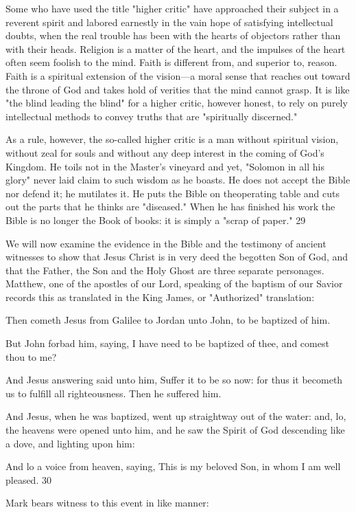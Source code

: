 Some who have used the title "higher critic" have approached their subject in a reverent spirit
and labored earnestly in the vain hope of satisfying intellectual doubts, when the real trouble
has been with the hearts of objectors rather than with their heads. Religion is a matter of the
heart, and the impulses of the heart often seem foolish to the mind. Faith is different from,
and superior to, reason. Faith is a spiritual extension of the vision—a moral sense that
reaches out toward the throne of God and takes hold of verities that the mind cannot grasp. It
is like "the blind leading the blind" for a higher critic, however honest, to rely on purely
intellectual methods to convey truths that are "spiritually discerned."

As a rule, however, the so-called higher critic is a man without spiritual vision, without zeal
for souls and without any deep interest in the coming of God's Kingdom. He toils not in the
Master's vineyard and yet, "Solomon in all his glory" never laid claim to such wisdom as he
boasts. He does not accept the Bible nor defend it; he mutilates it. He puts the Bible on theoperating table and cuts out the parts that he thinks are "diseased." When he has finished his
work the Bible is no longer the Book of books: it is simply a "scrap of paper." 29

We will now examine the evidence in the Bible and the testimony of ancient witnesses to
show that Jesus Christ is in very deed the begotten Son of God, and that the Father, the Son
and the Holy Ghost are three separate personages. Matthew, one of the apostles of our Lord,
speaking of the baptism of our Savior records this as translated in the King James, or
"Authorized" translation:

Then cometh Jesus from Galilee to Jordan unto John, to be baptized of him.

But John forbad him, saying, I have need to be baptized of thee, and comest thou to me?

And Jesus answering said unto him, Suffer it to be so now: for thus it becometh us to fulfill
all righteousness. Then he suffered him.

And Jesus, when he was baptized, went up straightway out of the water: and, lo, the heavens
were opened unto him, and he saw the Spirit of God descending like a dove, and lighting
upon him:

And lo a voice from heaven, saying, This is my beloved Son, in whom I am well pleased. 30

Mark bears witness to this event in like manner:

